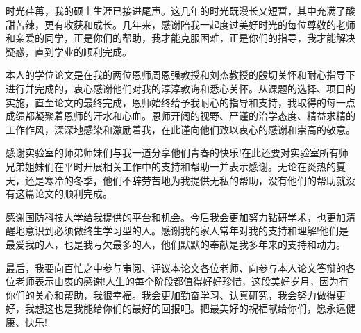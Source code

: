 

\begin{ack}
时光荏苒，我的硕士生涯已接进尾声。这几年的时光既漫长又短暂，其中充满了酸甜苦辣，更有收获和成长。几年来，感谢陪我一起度过美好时光的每位尊敬的老师和亲爱的同学，正是你们的帮助，我才能克服困难，正是你们的指导，我才能解决疑惑，直到学业的顺利完成。

本人的学位论文是在我的两位恩师周恩强教授和刘杰教授的殷切关怀和耐心指导下进行并完成的，衷心感谢他们对我的淳淳教诲和悉心关怀。从课题的选择、项目的实施，直至论文的最终完成，恩师始终给予我耐心的指导和支持，我取得的每一点成绩都凝聚着恩师的汗水和心血。恩师开阔的视野、严谨的治学态度、精益求精的工作作风，深深地感染和激励着我，在此谨向他们致以衷心的感谢和崇高的敬意。
  
感谢实验室的师弟师妹们与我一道分享他们青春的快乐!在此还要对实验室所有师兄弟姐妹们在平时开展相关工作中的支持和帮助一并表示感谢。无论在炎热的夏天，还是寒冷的冬季，他们不辞劳苦地为我提供无私的帮助，没有他们的帮助就没有这篇论文的顺利完成。
  
感谢国防科技大学给我提供的平台和机会。今后我会更加努力钻研学术，也更加清醒地意识到必须做终生学习型的人。感谢我的家人常年对我的支持和理解!他们是最爱我的人，也是我亏欠最多的人，他们默默的奉献是我多年来的支持和动力。
  
最后，我要向百忙之中参与审阅、评议本论文各位老师、向参与本人论文答辩的各位老师表示由衷的感谢!人生的每个阶段都值得好好珍惜，这段美好岁月，因为有你们的关心和帮助，我很幸福。我会更加勤奋学习、认真研究，我会努力做得更好，我想这也是我能给你们的最好的回报吧。把最美好的祝福献给你们，愿永远健康、快乐!
\end{ack}
